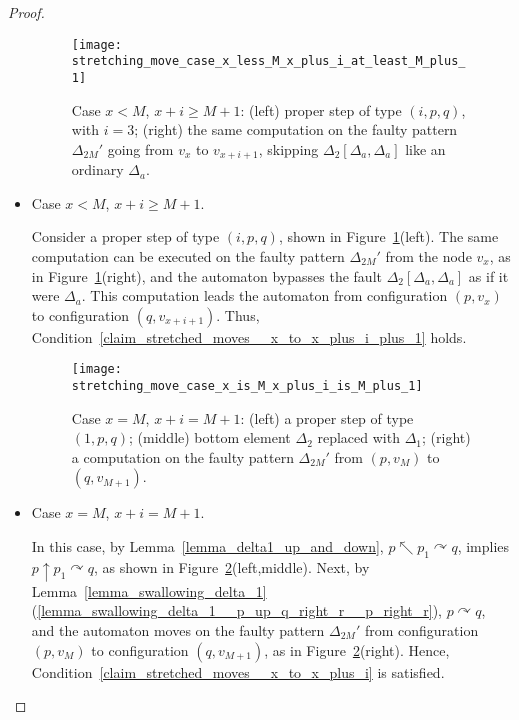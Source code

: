\documentclass[12pt,a4paper]{article}
\theoremstyle{definition}
\begin{document}
\begin{proof}
\begin{itemize}
\begin{figure}[t]
	\centerline{\texttt{[image: stretching\_move\_case\_x\_less\_M\_x\_plus\_i\_at\_least\_M\_plus\_1]}}
	\caption{Case $x < M$, $x+i \geqslant M+1$:
	(left) proper step of type $(i,p,q)$, with $i = 3$;
	(right) the same computation on the faulty pattern $\Delta_{2M}'$
	going from $v_x$ to $v_{x+i+1}$,
	skipping $\Delta_2[\Delta_a,\Delta_a]$ like an ordinary $\Delta_a$.}
	\label{f:stretching_move_case_x_less_M_x_plus_i_at_least_M_plus_1}
\end{figure}

\item
	Case $x < M$, $x+i \geqslant M+1$.
	
	Consider a proper step of type $(i,p,q)$,
	shown in Figure~\ref{f:stretching_move_case_x_less_M_x_plus_i_at_least_M_plus_1}(left).
	The same computation can be executed on the faulty pattern $\Delta_{2M}'$
	from the node $v_x$,
	as in Figure~\ref{f:stretching_move_case_x_less_M_x_plus_i_at_least_M_plus_1}(right),
	and the automaton bypasses the fault $\Delta_2[\Delta_a,\Delta_a]$
	as if it were $\Delta_a$.
	This computation leads the automaton
	from configuration $(p,v_x)$ to configuration $(q, v_{x+i+1})$.
	Thus, Condition~\ref{claim_stretched_moves__x_to_x_plus_i_plus_1} holds.

\begin{figure}[t]
	\centerline{\texttt{[image: stretching\_move\_case\_x\_is\_M\_x\_plus\_i\_is\_M\_plus\_1]}}
	\caption{Case $x=M$, $x+i=M+1$:
		(left) a proper step of type $(1,p,q)$;
		(middle) bottom element $\Delta_2$ replaced with $\Delta_1$;
		(right) a computation on the faulty pattern $\Delta_{2M}'$
			from $(p,v_M)$ to $(q,v_{M+1})$.}
	\label{f:stretching_move_case_x_is_M_x_plus_i_is_M_plus_1}
\end{figure}

\item
	Case $x = M$, $x+i = M+1$.
	
	In this case, by Lemma~\ref{lemma_delta1_up_and_down},
	$p \nwarrow p_1 \curvearrowright q$,
	implies $p \uparrow p_1 \curvearrowright q$,
	as shown in Figure~\ref{f:stretching_move_case_x_is_M_x_plus_i_is_M_plus_1}(left,middle).
	Next, by Lemma~\ref{lemma_swallowing_delta_1}(\ref{lemma_swallowing_delta_1__p_up_q_right_r__p_right_r}),
	$p \curvearrowright q$,
	and the automaton moves on the faulty pattern $\Delta_{2M}'$
	from configuration $(p,v_M)$ to configuration $(q, v_{M+1})$,
	as in Figure~\ref{f:stretching_move_case_x_is_M_x_plus_i_is_M_plus_1}(right).
	Hence, Condition~\ref{claim_stretched_moves__x_to_x_plus_i} is satisfied.


\end{itemize}
\end{proof}
\end{document}

